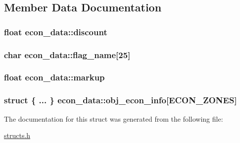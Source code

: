 \subsection{Member Data Documentation}
\hypertarget{structecon__data_a29673213b23a1dbccf6ac297c7a97b5c}{
\subsubsection[{discount}]{\setlength{\rightskip}{0pt plus 5cm}float econ\-\_\-data\-::discount}}\label{structecon__data_a29673213b23a1dbccf6ac297c7a97b5c}
\hypertarget{structecon__data_a93b46daea7a0f663d7bff100cd4362ce}{
\subsubsection[{flag\-\_\-name}]{\setlength{\rightskip}{0pt plus 5cm}char econ\-\_\-data\-::flag\-\_\-name\mbox{[}25\mbox{]}}}\label{structecon__data_a93b46daea7a0f663d7bff100cd4362ce}
\hypertarget{structecon__data_afdedf229eaa7dda94268e6a94bfec5d6}{
\subsubsection[{markup}]{\setlength{\rightskip}{0pt plus 5cm}float econ\-\_\-data\-::markup}}\label{structecon__data_afdedf229eaa7dda94268e6a94bfec5d6}
\hypertarget{structecon__data_ab53a2117ed208c348e1dd0e1b9ba009d}{
\subsubsection[{obj\-\_\-econ\-\_\-info}]{\setlength{\rightskip}{0pt plus 5cm}struct \{ ... \}   econ\-\_\-data\-::obj\-\_\-econ\-\_\-info\mbox{[}{\bf E\-C\-O\-N\-\_\-\-Z\-O\-N\-E\-S}\mbox{]}}}\label{structecon__data_ab53a2117ed208c348e1dd0e1b9ba009d}


The documentation for this struct was generated from the following file\-:\begin{DoxyCompactItemize}
\item 
\hyperlink{structs_8h}{structs.\-h}\end{DoxyCompactItemize}
